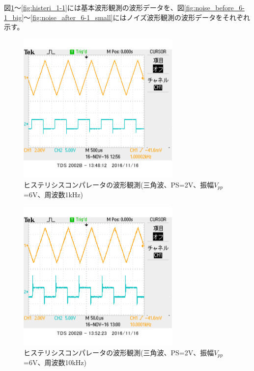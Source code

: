 \documentclass[11pt,a4j]{jsarticle}
\begin{document}
    図\ref{fig:histeri_2-1}～\ref{fig:histeri_1-1}には基本波形観測の波形データを、図\ref{fig:noise_before_6-1_big}～\ref{fig:noise_after_6-1_small}にはノイズ波形観測の波形データをそれぞれ示す。
    
    \begin{figure}[htbp]
  \centering
  \includegraphics[width=8cm,clip]{1_2_histeri_Vth2f1V6sankaku_ViVo.png}
  \caption{ヒステリシスコンパレータの波形観測(三角波、PS=2V、振幅$V_{pp}$=6V、周波数1kHz)}
  \label{fig:histeri_2-1}
 \end{figure}
 
 \begin{figure}[htbp]
  \centering
  \includegraphics[width=8cm,clip]{1_2_histeri_Vth2f10V6sankaku_ViVo.png}
  \caption{ヒステリシスコンパレータの波形観測(三角波、PS=2V、振幅$V_{pp}$=6V、周波数10kHz)}
  \label{fig:histeri_2-10}
 \end{figure}
 
\end{document}
